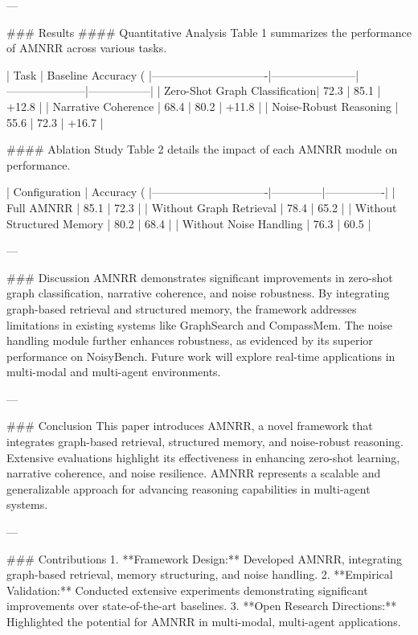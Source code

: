 ---

### Results  
#### Quantitative Analysis  
Table 1 summarizes the performance of AMNRR across various tasks.  

| Task                          | Baseline Accuracy (%
|-------------------------------|-----------------------|---------------------|-----------------|
| Zero-Shot Graph Classification| 72.3                 | 85.1               | +12.8           |
| Narrative Coherence           | 68.4                 | 80.2               | +11.8           |
| Noise-Robust Reasoning        | 55.6                 | 72.3               | +16.7           |

#### Ablation Study  
Table 2 details the impact of each AMNRR module on performance.  

| Configuration                 | Accuracy (%
|-------------------------------|--------------|----------------|
| Full AMNRR                    | 85.1         | 72.3           |
| Without Graph Retrieval       | 78.4         | 65.2           |
| Without Structured Memory     | 80.2         | 68.4           |
| Without Noise Handling        | 76.3         | 60.5           |

---

### Discussion  
AMNRR demonstrates significant improvements in zero-shot graph classification, narrative coherence, and noise robustness. By integrating graph-based retrieval and structured memory, the framework addresses limitations in existing systems like GraphSearch and CompassMem. The noise handling module further enhances robustness, as evidenced by its superior performance on NoisyBench. Future work will explore real-time applications in multi-modal and multi-agent environments.

---

### Conclusion  
This paper introduces AMNRR, a novel framework that integrates graph-based retrieval, structured memory, and noise-robust reasoning. Extensive evaluations highlight its effectiveness in enhancing zero-shot learning, narrative coherence, and noise resilience. AMNRR represents a scalable and generalizable approach for advancing reasoning capabilities in multi-agent systems.

---

### Contributions  
1. **Framework Design:** Developed AMNRR, integrating graph-based retrieval, memory structuring, and noise handling.  
2. **Empirical Validation:** Conducted extensive experiments demonstrating significant improvements over state-of-the-art baselines.  
3. **Open Research Directions:** Highlighted the potential for AMNRR in multi-modal, multi-agent applications.  

